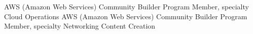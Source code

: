 %
%
%


\begin{scholarship}
					{AWS (Amazon Web Services) Community Builder Program Member, specialty Cloud Operations}
					{AWS (Amazon Web Services) Community Builder Program Member, specialty Networking Content Creation}
\end{scholarship}
